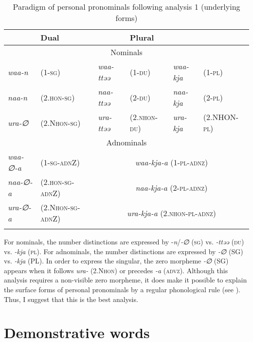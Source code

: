 \begin{table}
\caption{\label{tab:key:36}Paradigm of personal pronominals following analysis 1 (underlying forms)}
\begin{tabular}{l@{ }ll@{ }ll@{ }l}
\lsptoprule
\multicolumn{2}{l}{Singular} & \multicolumn{2}{l}{Dual} & \multicolumn{2}{l}{Plural}\\\midrule
\multicolumn{6}{c}{Nominals}\\\midrule
           \textit{waa-n} & (1-\textsc{sg})               & \textit{waa-ttəə} & (1-\textsc{du})      & \textit{waa-kja}  & (1-\textsc{pl})\\
           \textit{naa-n} &  (2.\textsc{hon}-\textsc{sg})          & \textit{naa-ttəə} & (2-\textsc{du})      & \textit{naa-kja}  & (2-\textsc{pl})\\
           \textit{ura-∅} &  (2.N\textsc{hon}-\textsc{sg})         & \textit{ura-ttəə} & (2.\textsc{nhon}-\textsc{du}) & \textit{ura-kja}  & (2.NHON-\textsc{pl})\\\midrule
\multicolumn{6}{c}{Adnominals}\\\midrule
           \textit{waa-∅-a} &  (1-\textsc{sg}-\textsc{adn}Z)       & \multicolumn{4}{c}{\textit{waa-kja-a} (1-\textsc{pl}-\textsc{adnz})}\\
           \textit{naa-∅-a} & (2.\textsc{hon}-\textsc{sg}-\textsc{adn}Z)    & \multicolumn{4}{c}{\textit{naa-kja-a} (2-\textsc{pl}-\textsc{adnz})}\\
           \textit{ura-∅-a} &  (2.N\textsc{hon}-\textsc{sg}-\textsc{adn}Z)  & \multicolumn{4}{c}{\textit{ura-kja-a} (2.\textsc{nhon}-\textsc{pl}-\textsc{adnz})}\\
\lspbottomrule
\end{tabular}
\end{table}

For nominals, the number distinctions are expressed by -\textit{n}/\textit{{}-∅} (\textsc{sg}) vs. \textit{{}-ttəə} (\textsc{du}) vs. \textit{{}-kja} (\textsc{pl}). For adnominals, the number distinctions are expressed by \textit{{}-∅} (SG) vs. \textit{{}-kja} (PL). In order to express the singular, the zero morpheme \textit{{}-∅} (SG) appears when it follows \textit{ura-} (2.N\textsc{hon}) or precedes \textit{{}-a} (\textsc{advz}). Although this analysis requires a non-visible zero morpheme, it does make it possible to explain the surface forms of personal pronominals by a regular phonological rule (see ). Thus, I suggest that this is the best analysis.

\section{Demonstrative words}

